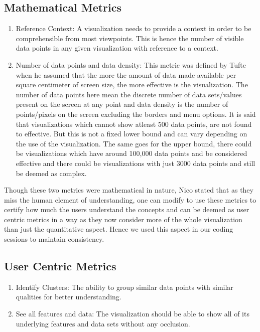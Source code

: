 \documentclass[seploa]{beavtex}
\begin{document}
\subsection{Mathematical Metrics}

\begin{enumerate}
\item Reference Context: A visualization needs to provide a context in order to be comprehensible from most viewpoints. This is hence the number of visible data points in any given visualization with reference to a context\cite{brath1997}.

\item Number of data points and data density: This metric was defined by Tufte when he assumed that the more the amount of data made available per square centimeter of screen size, the more effective is the visualization. The number of data points here mean the discrete number of data sets/values present on the screen at any point and data density is the number of points/pixels on the screen excluding the borders and menu options. It is said that visualizations which cannot show atleast 500 data points, are not found to effective\cite{brath1997}. But this is not a fixed lower bound and can vary depending on the use of the visualization. The same goes for the upper bound, there could be visualizations which have around 100,000 data points and be considered effective and there could be visualizations with just 3000 data points and still be deemed as complex\cite{brath1997}.
\end{enumerate}

Though these two metrics were mathematical in nature, Nico stated that as they miss the human element of understanding, one can modify to use these metrics to certify how much the users understand the concepts and can be deemed as user centric metrics in a way as they now consider more of the whole visualization than just the quantitative aspect\cite{nico2007}. Hence we used this aspect in our coding sessions to maintain consistency.

\subsection{User Centric Metrics}

\begin{enumerate}
\item Identify Clusters: The ability to group similar data points with similar qualities for better understanding\cite{grins2001}.

\item See all features and data: The visualization should be able to show all of its underlying features and data sets without any occlusion\cite{grins2001}.
\end{enumerate}
\end{document}

